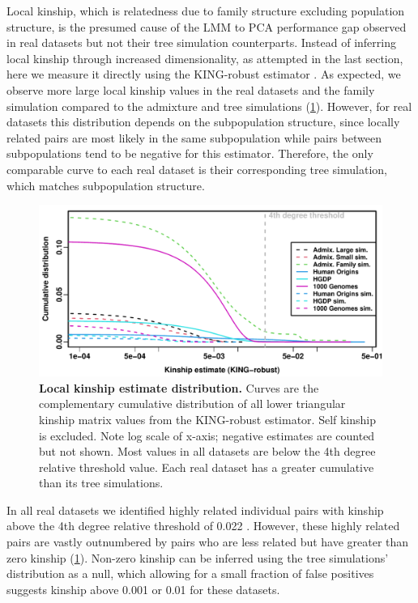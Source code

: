 \documentclass[11pt]{article}
\begin{document}
Local kinship, which is relatedness due to family structure excluding population structure, is the presumed cause of the LMM to PCA performance gap observed in real datasets but not their tree simulation counterparts.
Instead of inferring local kinship through increased dimensionality, as attempted in the last section, here we measure it directly using the KING-robust estimator \citep{manichaikul_robust_2010}.
As expected, we observe more large local kinship values in the real datasets and the family simulation compared to the admixture and tree simulations (\cref{fig:king}).
However, for real datasets this distribution depends on the subpopulation structure, since locally related pairs are most likely in the same subpopulation while pairs between subpopulations tend to be negative for this estimator.
Therefore, the only comparable curve to each real dataset is their corresponding tree simulation, which matches subpopulation structure.

\begin{figure}[bp!]
  \centering
  \includegraphics[width=\textwidth]{king_log-x.pdf}
  \caption{
    {\bf Local kinship estimate distribution.}
    Curves are the complementary cumulative distribution of all lower triangular kinship matrix values from the KING-robust estimator.
    Self kinship is excluded.
    Note log scale of x-axis; negative estimates are counted but not shown.
    Most values in all datasets are below the 4th degree relative threshold value.
    Each real dataset has a greater cumulative than its tree simulations.
  }
  \label{fig:king}
\end{figure}

In all real datasets we identified highly related individual pairs with kinship above the 4th degree relative threshold of 0.022 \citep{manichaikul_robust_2010, conomos_model-free_2016}.
However, these highly related pairs are vastly outnumbered by pairs who are less related but have greater than zero kinship (\cref{fig:king}).
Non-zero kinship can be inferred using the tree simulations' distribution as a null, which allowing for a small fraction of false positives suggests kinship above 0.001 or 0.01 for these datasets.
\end{document}
